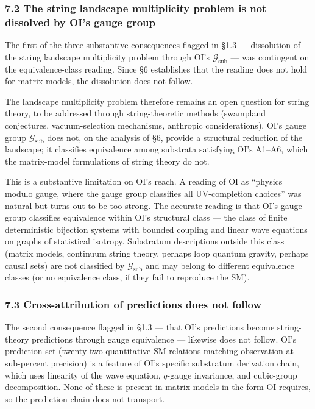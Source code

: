 \documentclass[
]{article}
\begin{document}
\hypertarget{the-string-landscape-multiplicity-problem-is-not-dissolved-by-ois-gauge-group}{%
\subsubsection{7.2 The string landscape multiplicity problem is not
dissolved by OI's gauge
group}\label{the-string-landscape-multiplicity-problem-is-not-dissolved-by-ois-gauge-group}}

The first of the three substantive consequences flagged in §1.3 ---
dissolution of the string landscape multiplicity problem through OI's
\(\mathcal{G}_{\text{sub}}\) --- was contingent on the equivalence-class
reading. Since §6 establishes that the reading does not hold for matrix
models, the dissolution does not follow.

The landscape multiplicity problem therefore remains an open question
for string theory, to be addressed through string-theoretic methods
(swampland conjectures, vacuum-selection mechanisms, anthropic
considerations). OI's gauge group \(\mathcal{G}_{\text{sub}}\) does not,
on the analysis of §6, provide a structural reduction of the landscape;
it classifies equivalence among substrata satisfying OI's A1--A6, which
the matrix-model formulations of string theory do not.

This is a substantive limitation on OI's reach. A reading of OI as
``physics modulo gauge, where the gauge group classifies all
UV-completion choices'' was natural but turns out to be too strong. The
accurate reading is that OI's gauge group classifies equivalence within
OI's structural class --- the class of finite deterministic bijection
systems with bounded coupling and linear wave equations on graphs of
statistical isotropy. Substratum descriptions outside this class (matrix
models, continuum string theory, perhaps loop quantum gravity, perhaps
causal sets) are not classified by \(\mathcal{G}_{\text{sub}}\) and may
belong to different equivalence classes (or no equivalence class, if
they fail to reproduce the SM).

\hypertarget{cross-attribution-of-predictions-does-not-follow}{%
\subsubsection{7.3 Cross-attribution of predictions does not
follow}\label{cross-attribution-of-predictions-does-not-follow}}

The second consequence flagged in §1.3 --- that OI's predictions become
string-theory predictions through gauge equivalence --- likewise does
not follow. OI's prediction set (twenty-two quantitative SM relations
matching observation at sub-percent precision) is a feature of OI's
specific substratum derivation chain, which uses linearity of the wave
equation, \(q\)-gauge invariance, and cubic-group decomposition. None of
these is present in matrix models in the form OI requires, so the
prediction chain does not transport.
\end{document}
